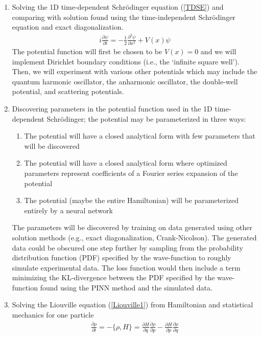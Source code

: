 \documentclass[10pt]{article}
\newcommand{\1}{\mathbf 1}
\begin{document}
\begin{enumerate}
	\item Solving the 1D time-dependent Schr\"odinger equation (\ref{TDSE}) and comparing with solution found using the time-independent Schr\"odinger equation and exact diagonalization.
	\begin{gather}
		i \frac{\partial \psi}{\partial t} = -\frac{1}{2} \frac{\partial^2\psi}{\partial x^2} + V(x) \psi
		\label{TDSE}
	\end{gather}
	The potential function will first be chosen to be $V(x) = 0$ and we will implement Dirichlet boundary conditions (i.e., the `infinite square well').
	Then, we will experiment with various other potentials which may include the quantum harmonic oscillator, the anharmonic oscillator, the double-well potential, and scattering potentials.
	\item Discovering parameters in the potential function used in the 1D time-dependent Schr\"odinger; the potential may be parameterized in three ways:
	\begin{enumerate}
		\item The potential will have a closed analytical form with few parameters that will be discovered
		\item The potential will have a closed analytical form where optimized parameters represent coefficients of a Fourier series expansion of the potential
		\item The potential (maybe the entire Hamiltonian) will be parameterized entirely by a neural network
	\end{enumerate}
	The parameters will be discovered by training on data generated using other solution methods (e.g., exact diagonalization, Crank-Nicolson).
	The generated data could be obscured one step further by sampling from the probability distribution function (PDF) specified by the wave-function to roughly simulate experimental data.
	The loss function would then include a term minimizing the KL-divergence between the PDF specified by the wave-function found using the PINN method and the simulated data.
	\item Solving the Liouville equation (\ref{Liouville1}) from Hamiltonian and statistical mechanics for one particle
	\begin{align}
		\label{Liouville1}
		\frac{\partial \rho}{\partial t}
		=
		-
		\{ \rho, H\}
		=
		\frac{\partial H}{\partial q}
		\frac{\partial \rho}{\partial p}
		-
		\frac{\partial H}{\partial p}
		\frac{\partial \rho}{\partial q}
	\end{align}

\end{enumerate}
\end{document}
